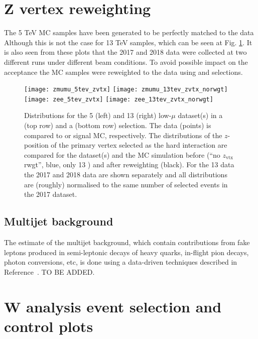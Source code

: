      \section{Z vertex reweighting }
     The 5 TeV MC samples have been generated to be perfectly matched to the data 
     Although this is not the case for 13 TeV samples, which can be seen at Fig. \ref{fig:zvtx}. 
     It is also seen from these plots that the 2017 and 2018 data were collected at two different runs under different beam conditions. 
   	 To avoid possible impact on the acceptance the MC samples were reweighted to the data using \Zee and \Zmm selections.
     
     \begin{figure}[tph]
     	\centering
     	\texttt{[image: zmumu\_5tev\_zvtx]}%
     	\texttt{[image: zmumu\_13tev\_zvtx\_norwgt]}
     	\texttt{[image: zee\_5tev\_zvtx]}%
     	\texttt{[image: zee\_13tev\_zvtx\_norwgt]}
     	\caption{Distributions for the 5 \TeV{} (left) and 13 \TeV{} (right)
     		low-$\mu$ dataset(s) in a \Zgmm (top row) and a \Zgee (bottom row)
     		selection. The data (points) is compared to \Zgmm or \Zgee signal
     		MC, respectively. The distributions of the $z$-position of the
     		primary vertex selected as the hard interaction are compared for
     		the dataset(s) and the MC simulation before (``no $z_\mathrm{vtx}$
     		rwgt'', blue, only 13 \TeV{}) and after reweighting (black). For
     		the 13 \TeV{} data the 2017 and 2018 data are shown separately and
     		all distributions are (roughly) normalised to the same number of
     		selected events in the 2017 dataset. }
     	\label{fig:zvtx}
     \end{figure}
    \subsection{Multijet background}
 The estimate of the multijet background, which contain contributions from fake leptons produced in semi-leptonic decays of heavy quarks, in-flight pion decays, photon conversions, etc, is done using a data-driven techniques described in Reference~\cite{Xu:2657146}. TO BE ADDED.
 
 
\section{W analysis event selection and control plots}
\label{sec:selection}

